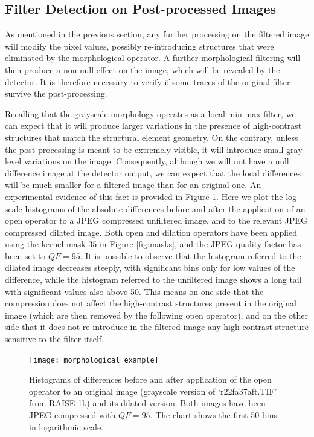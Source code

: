 \documentclass[review]{elsarticle}
\begin{document}
\subsection{Filter Detection on Post-processed Images}
As mentioned in the previous section, any further processing on the filtered image will modify the pixel values, possibly re-introducing structures that were eliminated by the morphological operator. A further morphological filtering will then produce a non-null effect on the image, which will be revealed by the detector. It is therefore necessary to verify if some traces of the original filter survive the post-processing.

Recalling that the grayscale morphology operates as a local min-max filter, we can expect that it will produce larger variations in the presence of high-contrast structures that match the structural element geometry. On the contrary, unless the post-processing is meant to be extremely visible, it will introduce small gray level variations on the image. Consequently, although we will not have a null difference image at the detector output, we can expect that the local differences will be much smaller for a filtered image than for an original one. An experimental evidence of this fact is provided in Figure \ref{fig:hist_ero}. Here we plot the log-scale histograms of the absolute differences before and after the application of an open operator to a JPEG compressed unfiltered image, and to the relevant JPEG compressed dilated image. Both open and dilation operators have been applied using the kernel mask $35$ in Figure \ref{fig:masks}, and the JPEG quality factor has been set to $QF=95$. It is possible to observe that the histogram referred to the dilated image decreases steeply, with significant bins only for low values of the difference, while the histogram referred to the unfiltered image shows a long tail with significant values also above 50. This means on one side that the compression does not affect the high-contrast structures present in the original image (which are then removed by the following open operator), and on the other side that it does not re-introduce in the filtered image any high-contrast structure sensitive to the filter itself.

\label{subsec:compr_img}
\begin{figure}[!ht]%
	\centering
	\texttt{[image: morphological\_example]}
	\caption{Histograms of differences before and after application of the open operator to an original image (grayscale version of `r22fa37aft.TIF' from RAISE-1k) and its dilated version. Both images have been JPEG compressed with $QF = 95$. The chart shows the first 50 bins in logarithmic scale. }
	\label{fig:hist_ero}
\end{figure}
\end{document}
